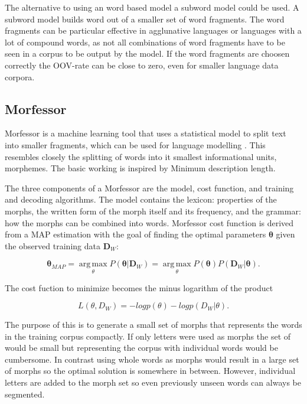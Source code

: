\documentclass[b5paper]{article}
\begin{document}
The alternative to using an word based model a subword model could be used. A subword model builds word out of a smaller set of word fragments. The word fragments can be particular effective in agglunative languages or languages with a lot of compound words, as not all combinations of word fragments have to be seen in a corpus to be output by the model. If the word fragments are choosen correctly the OOV-rate can be close to zero, even for smaller language data corpora.

\subsection{Morfessor}
Morfessor is a machine learning tool that uses a statistical model to split text into smaller fragments, which can be used for language modelling \cite{creutz2007unsupervised}. This resembles closely the splitting of words into it smallest informational units, morphemes. The basic working is inspired by Minimum description length.

The three components of a Morfessor are the model, cost function, and training and decoding algorithms. The model contains the lexicon: properties of the morphs, the written form of the morph itself and its frequency, and the grammar: how the morphs can be combined into words. Morfessor cost function is derived from a MAP estimation with the goal of finding the optimal parameters $\bm{\theta}$ given the observed training data $\bm{D}_W$:

\begin{equation}
\bm{\theta}_{MAP}=\operatorname*{arg\,max}_{\theta}P(\bm{\theta}|\bm{D}_W)=\operatorname*{arg\,max}_{\theta}P(\bm{\theta})P(\bm{D}_W|\bm{\theta}).
\end{equation}

The cost fuction to minimize becomes the minus logarithm of the product

\begin{equation}
L(\theta, D_W)=-log p(\theta)-log p(D_W|\theta).
\end{equation}

The purpose of this is to generate a small set of morphs that represents the words in the training corpus compactly. If only letters were used as morphs the set of would be small but representing the corpus with individual words would be cumbersome. In contrast using whole words as morphs would result in a large set of morphs so the optimal solution is somewhere in between. However, individual letters are added to the morph set so even previously unseen words can always be segmented.
\end{document}
